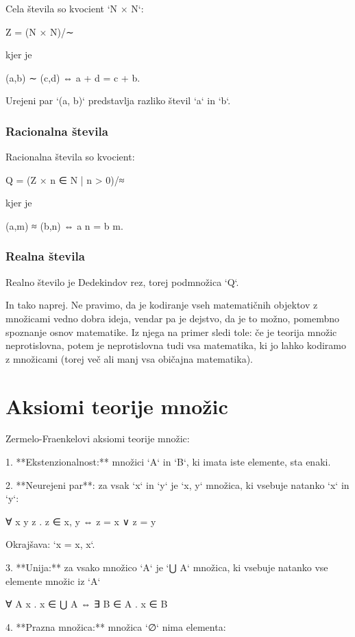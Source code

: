 Cela števila so kvocient `N × N`:

    Z = (N × N)/∼

kjer je

    (a,b) ∼ (c,d) ⇔ a + d = c + b.

Urejeni par `(a, b)` predstavlja razliko števil `a` in `b`.

\subsubsection{Racionalna števila}

Racionalna števila so kvocient:

    Q = (Z × {n ∈ N | n > 0})/≈

kjer je

    (a,m) ≈ (b,n) ⇔ a n = b m.

\subsubsection{Realna števila}

Realno število je Dedekindov rez, torej podmnožica `Q`.

In tako naprej. Ne pravimo, da je kodiranje vseh matematičnih objektov z množicami vedno
dobra ideja, vendar pa je dejstvo, da je to možno, pomembno spoznanje osnov matematike. Iz
njega na primer sledi tole: če je teorija množic neprotislovna, potem je neprotislovna
tudi vsa matematika, ki jo lahko kodiramo z množicami (torej več ali manj vsa običajna
matematika).

\section{Aksiomi teorije množic}

Zermelo-Fraenkelovi aksiomi teorije množic:

1. **Ekstenzionalnost:** množici `A` in `B`, ki imata iste elemente, sta enaki.

2. **Neurejeni par**: za vsak `x` in `y` je `{x, y}` množica, ki vsebuje natanko `x` in `y`:

        ∀ x y z . z ∈ {x, y} ⇔ z = x ∨ z = y

   Okrajšava: `{x} = {x, x}`.

3. **Unija:** za vsako množico `A` je `⋃ A` množica, ki vsebuje natanko vse
   elemente množic iz `A`

        ∀ A x . x ∈ ⋃ A ⇔ ∃ B ∈ A . x ∈ B

4. **Prazna množica:** množica `∅` nima elementa:

